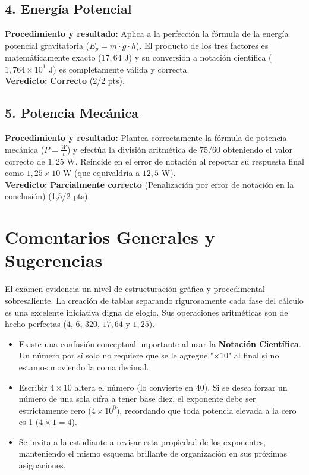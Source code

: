 \documentclass[12pt,letterpaper]{article}
\begin{document}
\subsection*{4. Energía Potencial}
\textbf{Procedimiento y resultado:} Aplica a la perfección la fórmula de la energía potencial gravitatoria ($E_p = m \cdot g \cdot h$). El producto de los tres factores es matemáticamente exacto ($17,64 \text{ J}$) y su conversión a notación científica ($1,764 \times 10^1 \text{ J}$) es completamente válida y correcta. \\
\textbf{Veredicto:} \textbf{Correcto} (2/2 pts).

\subsection*{5. Potencia Mecánica}
\textbf{Procedimiento y resultado:} Plantea correctamente la fórmula de potencia mecánica ($P = \frac{W}{t}$) y efectúa la división aritmética de $75 / 60$ obteniendo el valor correcto de $1,25 \text{ W}$. Reincide en el error de notación al reportar su respuesta final como $1,25 \times 10 \text{ W}$ (que equivaldría a $12,5 \text{ W}$). \\
\textbf{Veredicto:} \textbf{Parcialmente correcto} (Penalización por error de notación en la conclusión) (1,5/2 pts).

\vspace{0.5cm}
\section*{Comentarios Generales y Sugerencias}
El examen evidencia un nivel de estructuración gráfica y procedimental sobresaliente. La creación de tablas separando rigurosamente cada fase del cálculo es una excelente iniciativa digna de elogio. Sus operaciones aritméticas son de hecho perfectas ($4$, $6$, $320$, $17,64$ y $1,25$).
\begin{itemize}
    \item Existe una confusión conceptual importante al usar la \textbf{Notación Científica}. Un número por sí solo no requiere que se le agregue "$\times 10$" al final si no estamos moviendo la coma decimal.
    \item Escribir $4 \times 10$ altera el número (lo convierte en $40$). Si se desea forzar un número de una sola cifra a tener base diez, el exponente debe ser estrictamente cero ($4 \times 10^0$), recordando que toda potencia elevada a la cero es 1 ($4 \times 1 = 4$).
    \item Se invita a la estudiante a revisar esta propiedad de los exponentes, manteniendo el mismo esquema brillante de organización en sus próximas asignaciones.
\end{itemize}
\end{document}

